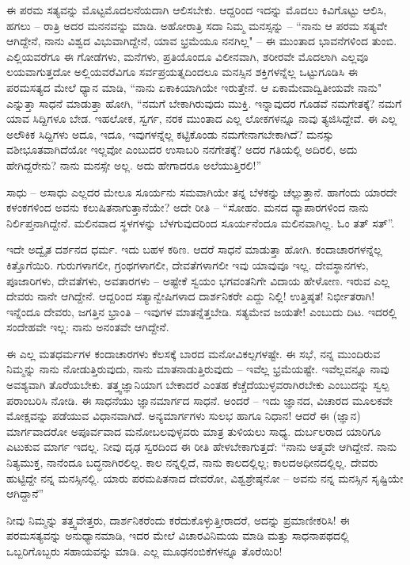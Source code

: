 ಈ ಪರಮ ಸತ್ಯವನ್ನು ಮೊಟ್ಟಮೊದಲನೆಯದಾಗಿ ಆಲಿಸಬೇಕು. ಆದ್ದರಿಂದ ಇದನ್ನು ಮೊದಲು ಕಿವಿಗೊಟ್ಟು ಆಲಿಸಿ, ಹಗಲು – ರಾತ್ರಿ ಅದರ ಮನನವನ್ನು ಮಾಡಿ. ಅಹೋರಾತ್ರಿ ಸದಾ ನಿಮ್ಮ ಮನಸ್ಸನ್ನು – “ನಾನು ಆ ಪರಮ ಸತ್ಯವೇ ಆಗಿದ್ದೇನೆ, ನಾನು ವಿಶ್ವದ ವಿಭುವಾಗಿದ್ದೇನೆ, ಯಾವ ಭ್ರಮೆಯೂ ನನಗಿಲ್ಲ" – ಈ ಮುಂತಾದ ಭಾವನೆಗಳಿಂದ ತುಂಬಿ. ಎಲ್ಲಿಯವರೆಗೂ ಈ ಗೋಡೆಗಳು, ಮನೆಗಳು, ಪ್ರತಿಯೊಂದೂ ವಿಲೀನವಾಗಿ, ಶರೀರವೇ ಮೊದಲಾಗಿ ಎಲ್ಲವೂ ಲಯವಾಗುತ್ತದೋ ಅಲ್ಲಿಯವರೆವಿಗೂ ಸರ್ವಪ್ರಯತ್ನದಿಂದಲೂ ಮನಸ್ಸಿನ ಶಕ್ತಿಗಳನ್ನೆಲ್ಲ ಒಟ್ಟುಗೂಡಿಸಿ ಈ ಪರಮಸತ್ಯದ ಮೇಲೆ ಧ್ಯಾನ ಮಾಡಿ, “ನಾನು ಏಕಾಕಿಯಾಗಿಯೇ ಇರುತ್ತೇನೆ. ಆ ಏಕಾಮೇವಾದ್ವಿತೀಯವೇ ನಾನು" ಎನ್ನುತ್ತಾ ಸಾಧನೆ ಮಾಡುತ್ತಾ ಹೋಗಿ, “ನಮಗೆ ಬೇಕಾಗಿರುವುದು ಮುಕ್ತಿ. ಇನ್ನಾವುದರ ಗೊಡವೆ ನಮಗೇತಕ್ಕೆ? ನಮಗೆ ಯಾವ ಸಿದ್ದಿಗಳೂ ಬೇಡ. ಇಹಲೋಕ, ಸ್ವರ್ಗ, ನರಕ ಮುಂತಾದ ಎಲ್ಲ ಲೋಕಗಳನ್ನೂ ನಾವು ತ್ಯಜಿಸಿದ್ದೇವೆ. ಈ ಎಲ್ಲ ಅಲೌಕಿಕ ಸಿದ್ದಿಗಳು ಅದೂ, ಇದೂ, ಇವುಗಳನ್ನೆಲ್ಲ ಕಟ್ಟಿಕೊಂಡು ನಮಗೇನಾಗಬೇಕಾಗಿದೆ? ಮನಸ್ಸು ವಶೀಭೂತವಾಗಿದೆಯೋ ಇಲ್ಲವೋ ಎಂಬುದರ ಉಸಾಬರಿ ನನಗೇತಕ್ಕೆ? ಅದರ ಗತಿಯಲ್ಲಿ ಅದಿರಲಿ, ಅದು ಹೇಗಿದ್ದರೇನು? ನಾನು ಮನಸ್ಸೇ ಅಲ್ಲ. ಅದು ಹೇಗಾದರೂ ಅಲೆಯುತ್ತಿರಲಿ!”

ಸಾಧು – ಅಸಾಧು ಎಲ್ಲದರ ಮೇಲೂ ಸೂರ್ಯನು ಸಮವಾಗಿಯೇ ತನ್ನ ಬೆಳಕನ್ನು ಚೆಲ್ಲುತ್ತಾನೆ. ಹಾಗೆಂದು ಯಾರದೇ ಕಳಂಕಗಳಿಂದ ಅವನು ಕಲುಷಿತನಾಗುತ್ತಾನೆಯೇ? ಅದೇ ರೀತಿ – “ಸೋಹಂ. ಮನದ ವ್ಯಾಪಾರಗಳಿಂದ ನಾನು ನಿರ್ಲಿಪ್ತನಾಗಿದ್ದೇನೆ. ಮಲಿನವಾದ ಸ್ಥಳಗಳನ್ನು ಬೆಳಗುವುದರಿಂದ ಸೂರ್ಯನೆಂದೂ ಮಲಿನವಾಗಿಲ್ಲ. ಓಂ ತತ್ ಸತ್”.

ಇದೇ ಅದ್ವೈತ ದರ್ಶನದ ಧರ್ಮ. ಇದು ಬಹಳ ಕಠಿಣ. ಆದರೆ ಸಾಧನೆ ಮಾಡುತ್ತಾ ಹೋಗಿ. ಕಂದಾಚಾರಗಳನ್ನೆಲ್ಲ ಕಿತ್ತೊಗೆಯಿರಿ. ಗುರುಗಳಾಗಲೀ, ಗ್ರಂಥಗಳಾಗಲೀ, ದೇವತೆಗಳಾಗಲೀ ಇವು ಯಾವುವೂ ಇಲ್ಲ. ದೇವಸ್ಥಾನಗಳು, ಪೂಜಾರಿಗಳು, ದೇವತೆಗಳು, ಅವತಾರಗಳು – ಅಷ್ಟೇಕೆ ಸ್ವಯಂ ಭಗವಂತನಿಗೇ ವಿದಾಯ ಹೇಳೋಣ. ಇರುವ ಎಲ್ಲ ದೇವರು ನಾನೇ ಆಗಿದ್ದೇನೆ. ಆದ್ದರಿಂದ ಸತ್ಯಾನ್ವೇಷಿಗಳಾದ ದಾರ್ಶನಿಕರೇ ಎದ್ದು ನಿಲ್ಲಿ! ಉತ್ತಿಷ್ಠತ! ನಿರ್ಭೀತರಾಗಿ! ಇನ್ನೆಂದೂ ದೇವರು, ಜಗತ್ತಿನ ಭ್ರಾಂತಿ – ಇವುಗಳ ಮಾತನ್ನೆತ್ತಬೇಡಿ. ಸತ್ಯಮೇವ ಜಯತೇ! ಎಂಬುದು ದಿಟ. ಇದರಲ್ಲಿ ಸಂದೇಹವೇ ಇಲ್ಲ: ನಾನು ಅನಂತವೇ ಆಗಿದ್ದೇನೆ.

ಈ ಎಲ್ಲ ಮತಧರ್ಮಗಳ ಕಂದಾಚಾರಗಳು ಕೆಲಸಕ್ಕೆ ಬಾರದ ಮನೋವಿಕಲ್ಪಗಳಷ್ಟೇ. ಈ ಸಭೆ, ನನ್ನ ಮುಂದಿರುವ ನಿಮ್ಮನ್ನು ನಾನು ನೋಡುತ್ತಿರುವುದು, ನಾನು ಮಾತನಾಡುತ್ತಿರುವುದು – ಇವೆಲ್ಲ ಭ್ರಮೆಯಷ್ಟೇ. ಇವೆಲ್ಲವನ್ನೂ ನಾವು ಅವಶ್ಯವಾಗಿ ತೊರೆಯಬೇಕು. ತತ್ತ್ವಜ್ಞಾನಿಯಾಗ ಬೇಕಾದರೆ ಎಂತಹ ಕೆಚ್ಚೆದೆಯುಳ್ಳವರಾಗಿರಬೇಕು ಎಂಬುದನ್ನು ಸ್ವಲ್ಪ ಪರಾಂಬರಿಸಿ ನೋಡಿ. ಈ ಸಾಧನೆಯು ಜ್ಞಾನಮಾರ್ಗದ ಸಾಧನೆ. ಅಂದರೆ – ಇದು ಜ್ಞಾನದ, ವಿಚಾರದ ಮೂಲಕವೇ ಮೋಕ್ಷವನ್ನು ಪಡೆಯುವ ವಿಧಾನವಾಗಿದೆ. ಅನ್ಯಮಾರ್ಗಗಳು ಸುಲಭ ಹಾಗೂ ನಿಧಾನ! ಆದರೆ ಈ (ಜ್ಞಾನ) ಮಾರ್ಗವಾದರೋ ಅಪೂರ್ವವಾದ ಮನೋಬಲವುಳ್ಳವರು ಮಾತ್ರ ತುಳಿಯಲು ಸಾಧ್ಯ. ದುರ್ಬಲರಾದ ಯಾರಿಗೂ ಎಟುಕುವ ಮಾರ್ಗ ಇದಲ್ಲ. ನೀವು ದೃಢ ಸ್ವರದಿಂದ ಈ ರೀತಿ ಹೇಳಬೇಕಾಗುತ್ತದೆ: “ನಾನು ಆತ್ಮವೇ ಆಗಿದ್ದೇನೆ. ನಾನು ನಿತ್ಯಮುಕ್ತ, ನಾನೆಂದೂ ಬದ್ಧನಾಗಿರಲಿಲ್ಲ. ಕಾಲ ನನ್ನಲ್ಲಿದೆ, ನಾನು ಕಾಲದಲ್ಲಿಲ್ಲ; ಕಾಲದ\break ಅಧೀನದಲ್ಲಿಲ್ಲ. ದೇವರು ಹುಟ್ಟಿದ್ದೇ ನನ್ನ ಮನಸ್ಸಿನಲ್ಲಿ. ಯಾರು ಪರಮಪಿತನಾದ ದೇವರೋ, ವಿಶ್ವಶ್ರೇಷ್ಠನೋ – ಅವನು ನನ್ನ ಮನಸ್ಸಿನ ಸೃಷ್ಟಿಯೇ ಆಗಿದ್ದಾನೆ''

ನೀವು ನಿಮ್ಮನ್ನು ತತ್ತ್ವವೇತ್ತರು, ದಾರ್ಶನಿಕರೆಂದು ಕರೆದುಕೊಳ್ಳುತ್ತೀರಾದರೆ, ಅದನ್ನು ಪ್ರಮಾಣೀಕರಿಸಿ! ಈ ಪರಮಸತ್ಯವನ್ನು ಅನುಧ್ಯಾನಮಾಡಿ, ಇದರ ಮೇಲೆ ವಿಚಾರವಿನಿಮಯ ಮಾಡಿ ಮತ್ತು ಸಾಧನಾಪಥದಲ್ಲಿ ಒಬ್ಬರಿಗೊಬ್ಬರು ಸಹಾಯವನ್ನು ಮಾಡಿ. ಎಲ್ಲ ಮೂಢನಂಬಿಕೆಗಳನ್ನೂ ತೊರೆಯಿರಿ!

